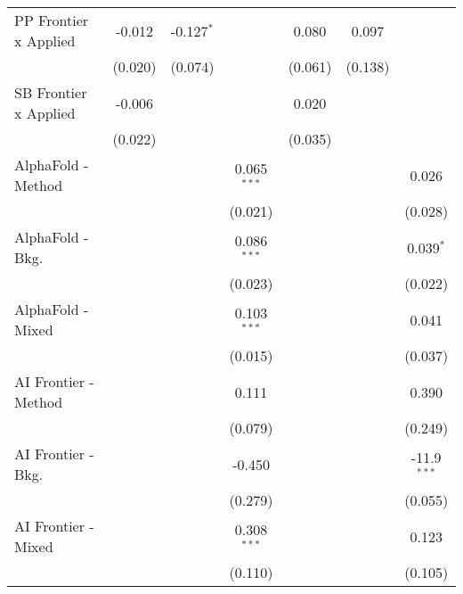 \begin{tabular}{lcccccc}
   PP Frontier x Applied          & -0.012        & -0.127$^{*}$  &                & 0.080   & 0.097         &   \\   
                                  & (0.020)       & (0.074)       &                & (0.061) & (0.138)       &   \\   
   SB Frontier x Applied          & -0.006        &               &                & 0.020   &               &   \\   
                                  & (0.022)       &               &                & (0.035) &               &   \\   
   AlphaFold - Method             &               &               & 0.065$^{***}$  &         &               & 0.026\\   
                                  &               &               & (0.021)        &         &               & (0.028)\\   
   AlphaFold - Bkg.               &               &               & 0.086$^{***}$  &         &               & 0.039$^{*}$\\   
                                  &               &               & (0.023)        &         &               & (0.022)\\   
   AlphaFold - Mixed              &               &               & 0.103$^{***}$  &         &               & 0.041\\   
                                  &               &               & (0.015)        &         &               & (0.037)\\   
   AI Frontier - Method           &               &               & 0.111          &         &               & 0.390\\   
                                  &               &               & (0.079)        &         &               & (0.249)\\   
   AI Frontier - Bkg.             &               &               & -0.450         &         &               & -11.9$^{***}$\\   
                                  &               &               & (0.279)        &         &               & (0.055)\\   
   AI Frontier - Mixed            &               &               & 0.308$^{***}$  &         &               & 0.123\\   
                                  &               &               & (0.110)        &         &               & (0.105)\\   

\end{tabular}
